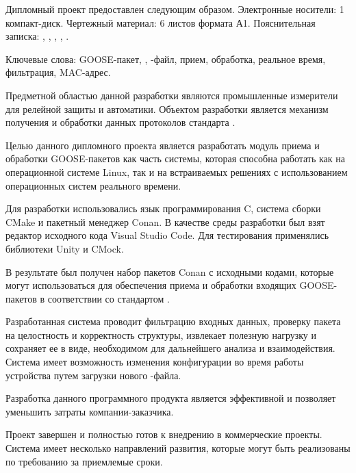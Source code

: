 
Дипломный проект предоставлен следующим образом. Электронные носители: 1
компакт-диск. Чертежный материал: 6 листов формата А1. Пояснительная записка:
\insertNumPagesText ,
\insertNumFiguresText , \insertNumTablesText ,
\insertNumBibElementsText ,
\insertNumAnnexesText .

Ключевые слова: GOOSE-пакет, \iecStd, \cid-файл, прием, обработка, реальное время, фильтрация, MAC-адрес.

Предметной областью данной разработки являются промышленные измерители
для релейной защиты и автоматики.
Объектом разработки является механизм получения и обработки данных протоколов стандарта \iecStd.

Целью данного дипломного проекта является разработать модуль приема и обработки GOOSE-пакетов как часть системы, которая способна работать как на операционной системе Linux, так и на встраиваемых решениях с использованием операционных систем реального времени.

Для разработки использовались язык программирования C,
система сборки CMake и пакетный менеджер Conan.
В качестве среды разработки
был взят редактор исходного кода Visual Studio Code.
Для тестирования применялись библиотеки Unity и CMock.

В результате был получен набор пакетов Conan с исходными кодами, которые
могут использоваться для обеспечения приема и обработки входящих
GOOSE-пакетов в соответствии со стандартом \iecStd.

Разработанная система проводит фильтрацию входных данных,
проверку пакета на целостность и корректность
структуры, извлекает полезную нагрузку
и сохраняет ее в виде, необходимом для дальнейшего
анализа и взаимодействия.
Система имеет возможность изменения конфигурации во время работы устройства
путем загрузки нового \cid-файла.

Разработка данного программного продукта является эффективной
и позволяет уменьшить затраты компании-заказчика.

Проект завершен и полностью готов к внедрению в коммерческие проекты.
Система имеет несколько направлений развития, которые могут быть реализованы
по требованию за приемлемые сроки.

\newpage
